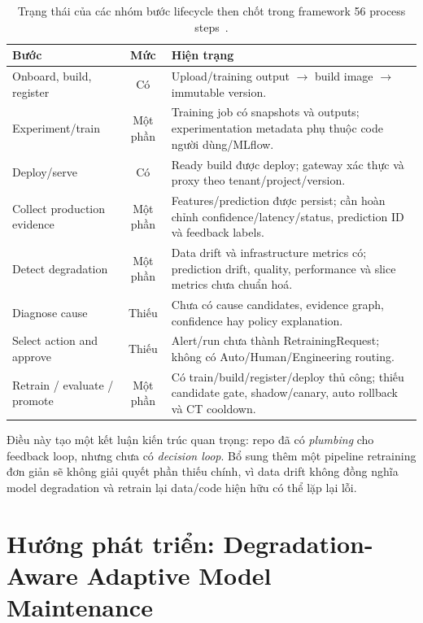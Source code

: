 \documentclass[11pt,a4paper]{article}
\newcommand{\statusyes}{\textcolor{green!45!black}{Có}}
\newcommand{\statuspartial}{\textcolor{orange!75!black}{Một phần}}
\newcommand{\statusno}{\textcolor{red!60!black}{Thiếu}}
\begin{document}
\begin{table}[ht]
\centering
\small
\caption{Trạng thái của các nhóm bước lifecycle then chốt trong framework 56 process steps~\cite{najafabadi2026}.}
\begin{tabularx}{\linewidth}{@{}p{3.2cm}cY@{}}
\toprule
\textbf{Bước} & \textbf{Mức} & \textbf{Hiện trạng} \\
\midrule
Onboard, build, register & \statusyes & Upload/training output $\rightarrow$ build image $\rightarrow$ immutable version. \\
Experiment/train & \statuspartial & Training job có snapshots và outputs; experimentation metadata phụ thuộc code người dùng/MLflow. \\
Deploy/serve & \statusyes & Ready build được deploy; gateway xác thực và proxy theo tenant/project/version. \\
Collect production evidence & \statuspartial & Features/prediction được persist; cần hoàn chỉnh confidence/latency/status, prediction ID và feedback labels. \\
Detect degradation & \statuspartial & Data drift và infrastructure metrics có; prediction drift, quality, performance và slice metrics chưa chuẩn hoá. \\
Diagnose cause & \statusno & Chưa có cause candidates, evidence graph, confidence hay policy explanation. \\
Select action and approve & \statusno & Alert/run chưa thành RetrainingRequest; không có Auto/Human/Engineering routing. \\
Retrain / evaluate / promote & \statuspartial & Có train/build/register/deploy thủ công; thiếu candidate gate, shadow/canary, auto rollback và CT cooldown. \\
\bottomrule
\end{tabularx}
\end{table}

Điều này tạo một kết luận kiến trúc quan trọng: repo đã có \emph{plumbing} cho feedback loop, nhưng chưa có \emph{decision loop}. Bổ sung thêm một pipeline retraining đơn giản sẽ không giải quyết phần thiếu chính, vì data drift không đồng nghĩa model degradation và retrain lại data/code hiện hữu có thể lặp lại lỗi.

\section{Hướng phát triển: Degradation-Aware Adaptive Model Maintenance}
\end{document}
